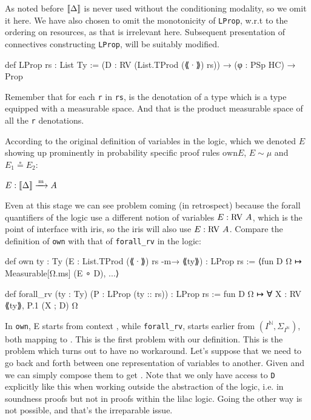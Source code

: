 As noted before $\llbracket \Delta \rrbracket$ is never used without the conditioning modality, so we omit it here. We have also chosen to omit the
monotonicity of \texttt{LProp}, w.r.t to the ordering on resources, as that is irrelevant here. Subsequent presentation of connectives constructing \texttt{LProp},
will be suitably modified.

\begin{leancode}
def LProp {rs : List Ty} := (D : RV (List.TProd (⟪·⟫) rs)) → (φ : PSp HC) → Prop
\end{leancode}

Remember that for each \texttt{r} in \texttt{rs},  is the denotation of a type which is a type equipped with a measurable space. And that
 is the product measurable space of all the \texttt{r} denotations.

According to the original definition of variables in the logic, which we denoted $E$ showing up prominently in probability specific proof rules $\mathrm{own} E$, $E \sim \mu$
and $E_1 \circeq E_2$:

$E : \llbracket \Delta \rrbracket \xrightarrow{\,\mathrm{m}\,} A$

Even at this stage we can see problem coming (in retrospect) because the forall quantifiers of the logic use a different notion of
variables $E : \mathrm{RV\ } A$, which is the point of interface with iris, so the iris will also use $E : \mathrm{RV\ } A$. Compare the definition of \texttt{own}
with that of \texttt{forall\_rv}
in the logic:

\begin{leancode}
def own {ty : Ty} (E : List.TProd (⟪·⟫) rs -m→ ⟪ty⟫) : LProp rs :=
  ⟨fun D Ω ↦ Measurable[Ω.ms] (E ∘ D), ...⟩

def forall_rv (ty : Ty) (P : LProp (ty :: rs)) : LProp rs :=
  fun D Ω ↦ ∀ X : RV ⟪ty⟫, P.1 (X ; D) Ω
\end{leancode}

In \texttt{own}, E starts from context , while \texttt{forall\_rv}, starts earlier from $(I^\mathbb{N}, \Sigma_{I^\mathbb{N}})$, both mapping to .
This is the first problem with our definition. This is the problem which turns out to have no workaround. Let's suppose that we need to go back and forth between one representation of
variables to another. Given  and  we can simply compose them to get . Note
that we only have access to \texttt{D} explicitly like this when working outside the abstraction of the logic, i.e. in soundness proofs but not in proofs within the lilac logic.
Going the other way is not possible, and that's the irreparable issue.


